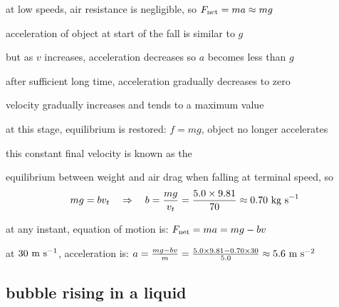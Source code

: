 {\cmt at low speeds, air resistance is negligible, so $F_\text{net} =ma \approx mg$

acceleration of object at start of the fall is similar to $g$

but as $v$ increases, acceleration decreases so $a$ becomes less than $g$

\cmt after sufficient long time, acceleration gradually decreases to zero

velocity gradually increases and tends to a maximum value

at this stage, equilibrium is restored: $f=mg$, object no longer accelerates

this constant final velocity is known as the 



\begin{soln}equilibrium between weight and air drag when falling at terminal speed, so
\begin{equation*}
	mg = bv_t \quad \Rightarrow \quad b = \frac{mg}{v_t} = \frac{5.0\times9.81}{70} \approx 0.70 \text{ kg s}^{-1}
\end{equation*}

at any instant, equation of motion is: $F_\text{net} = ma = mg - bv$

at $30\text{ m s$^{-1}$}$, acceleration is: $a = \frac{mg-bv}{m} = \frac{5.0\times9.81-0.70\times30}{5.0} \approx 5.6 \text{ m s$^{-2}$}$ \end{soln}

\subsection*{bubble rising in a liquid}

\begin{marginfigure}
	\vspace*{-16pt}
	\centering
	\vspace*{-16pt}
\end{marginfigure}

}
